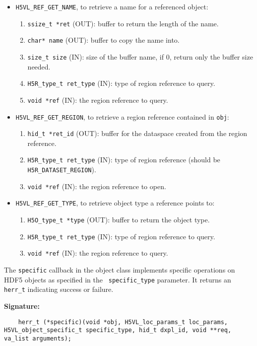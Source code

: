 \begin{itemize}
\item {\tt H5VL\_REF\_GET\_NAME}, to retrieve a name for a referenced object:
  \begin{enumerate}
  \item {\tt ssize\_t *ret} (OUT): buffer to return the length of the
    name.
  \item {\tt char* name} (OUT): buffer to copy the name into.
  \item {\tt size\_t size} (IN): size of the buffer name, if 0, return
    only the buffer size needed.
  \item {\tt H5R\_type\_t ret\_type} (IN): type of region reference to
    query.
  \item {\tt void *ref} (IN): the region reference to query.
  \end{enumerate}
  
\item {\tt H5VL\_REF\_GET\_REGION}, to retrieve a region reference
  contained in {\tt obj}:
  \begin{enumerate}
  \item {\tt hid\_t *ret\_id} (OUT): buffer for the dataspace created
    from the region reference.
  \item {\tt H5R\_type\_t ret\_type} (IN): type of region reference
    (should be {\tt H5R\_DATASET\_REGION}).
  \item {\tt void *ref} (IN): the region reference to open.
  \end{enumerate}

\item {\tt H5VL\_REF\_GET\_TYPE}, to retrieve object type a reference
  points to:
  \begin{enumerate}
  \item {\tt H5O\_type\_t *type} (OUT): buffer to return the object type.
  \item {\tt H5R\_type\_t ret\_type} (IN): type of region reference to
    query.
  \item {\tt void *ref} (IN): the region reference to query.
  \end{enumerate}
\end{itemize}

The {\tt specific} callback in the object class implements specific operations on HDF5 objects as specified in the {\tt
  specific\_type} parameter. It returns an {\tt herr\_t} indicating success or failure.

\textbf{Signature:}
\begin{lstlisting}
	herr_t (*specific)(void *obj, H5VL_loc_params_t loc_params, H5VL_object_specific_t specific_type, hid_t dxpl_id, void **req, va_list arguments);
\end{lstlisting}

